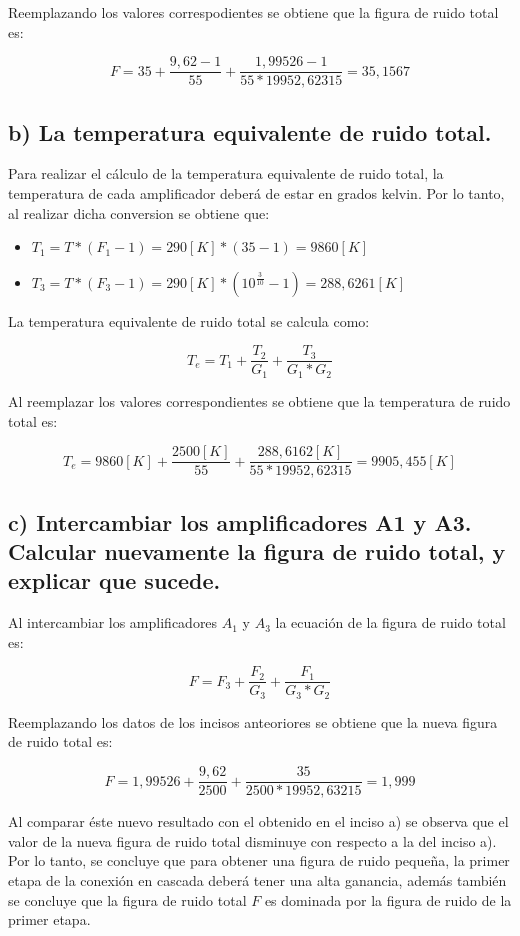 	Reemplazando los valores correspodientes se obtiene que la figura de ruido total es: 
	
	\[
		F = 35 + \frac{9,62 -1}{55} + \frac{1,99526 - 1}{55 * 19952,62315} = 35,1567
	\]






\subsection*{b) La temperatura equivalente de ruido total.}

	Para realizar el cálculo de la temperatura equivalente de ruido total, la temperatura de cada amplificador deberá de estar en grados kelvin. Por lo tanto, al realizar dicha conversion se obtiene que:
	
	\begin{itemize}
		\item $ T_1 = T*(F_1 - 1) = 290 [K]*(35 -1) = 9860 [K]$
		\item $ T_3 = T*(F_3 - 1) = 290[K]*(10^\frac{3}{10} -1) = 288,6261 [K] $
	\end{itemize}

	La temperatura equivalente de ruido total se calcula como:
	
	\[
		T_e = T_1 + \frac{T_2}{G_1} + \frac{T_3}{G_1 * G_2}
	\]
	
	Al reemplazar los valores correspondientes se obtiene que la temperatura de ruido total es:
	
	\[
		T_e = 9860 [K] + \frac{2500 [K]}{55} + \frac{288,6162 [K]}{55 * 19952,62315} = 9905,455 [K]
	\]


\subsection*{c) Intercambiar los amplificadores A1 y A3. Calcular nuevamente la figura de ruido total, y explicar que sucede.}

	Al intercambiar los amplificadores $A_1$ y $A_3$ la ecuación de la figura de ruido total es:
	
	\[
		F = F_3 + \frac{F_2}{G_3} + \frac{F_1}{G_3 * G_2}
	\]
	
	Reemplazando los datos de los incisos anteoriores se obtiene que la nueva figura de ruido total es:
	
	\[
		F = 1,99526 + \frac{9,62}{2500} + \frac{35}{2500 * 19952,63215} = 1,999
	\]
	
	Al comparar éste nuevo resultado con el obtenido en el inciso a) se observa que el valor de la nueva figura de ruido total disminuye con respecto a la del inciso a). Por lo tanto, se concluye que para obtener una figura de ruido pequeña, la primer etapa de la conexión en cascada deberá tener una alta ganancia, además también se concluye que la figura de ruido total $F$ es dominada por la figura de ruido de la primer etapa.\par 
	
